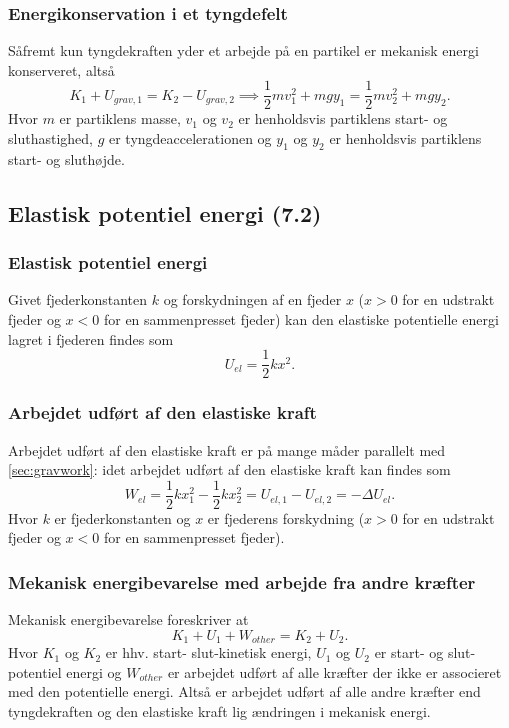\subsubsection{Energikonservation i et tyngdefelt} \label{afs:ekonstyn}
Såfremt kun tyngdekraften yder et arbejde på en partikel er mekanisk energi konserveret, altså
\[ 
K_1 + U_{grav,1} = K_2 - U_{grav,2} \implies \frac{1}{2}mv_1^2 + mgy_1 = \frac{1}{2}mv_2^2 + mgy_2
.\]
Hvor $m$ er partiklens masse, $v_1$ og $v_2$ er henholdsvis partiklens start- og sluthastighed, $g$ er tyngdeaccelerationen og $y_1$ og $y_2$ er henholdsvis partiklens start- og sluthøjde.

\subsection{Elastisk potentiel energi (7.2)}

\subsubsection{Elastisk potentiel energi} \label{afs:epotela}
Givet fjederkonstanten $k$ og forskydningen af en fjeder $x$ ($x>0$ for en udstrakt fjeder og $x<0$ for en sammenpresset fjeder) kan den elastiske potentielle energi lagret i fjederen findes som
\[ 
U_{el} = \frac{1}{2}kx^2
.\]

\subsubsection{Arbejdet udført af den elastiske kraft} \label{afs:wela}
Arbejdet udført af den elastiske kraft er på mange måder parallelt med \ref{sec:gravwork}:  idet arbejdet udført af den elastiske kraft kan findes som
\[ 
W_{el} = \frac{1}{2}kx_1^2 - \frac{1}{2}kx_2^2 = U_{el,1} - U_{el,2} = -\Delta U_{el}
.\]
Hvor $k$ er fjederkonstanten og $x$ er fjederens forskydning ($x>0$ for en udstrakt fjeder og $x<0$ for en sammenpresset fjeder).


\subsubsection{Mekanisk energibevarelse med arbejde fra andre kræfter} \label{afs:ebevkr}
Mekanisk energibevarelse foreskriver at
\[ 
K_1 + U_1 + W_{other} = K_2 + U_2
.\]
Hvor $K_1$ og $K_2$ er hhv. start- slut-kinetisk energi, $U_1$ og $U_2$ er start- og slut-potentiel energi og $W_{other}$ er arbejdet udført af alle kræfter der ikke er associeret med den potentielle energi. Altså er arbejdet udført af alle andre kræfter end tyngdekraften og den elastiske kraft lig ændringen i mekanisk energi.


